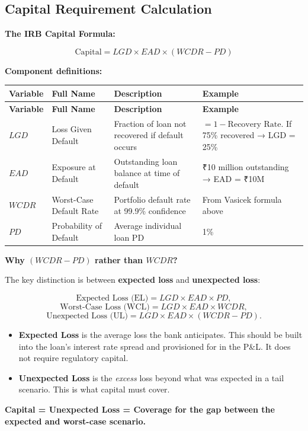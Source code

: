 \documentclass[12pt,openany]{book}
\theoremstyle{definition}
\theoremstyle{remark}
\begin{document}
\medskip
\subsection{Capital Requirement Calculation}
\textbf{The IRB Capital Formula:}

\[
\boxed{\text{Capital} = LGD \times EAD \times (WCDR - PD)}
\]

\textbf{Component definitions:}

\begingroup
\footnotesize
\begin{longtable}{@{}L{0.15\textwidth}L{0.25\textwidth}L{0.25\textwidth}L{0.25\textwidth}@{}}
\toprule
\textbf{Variable} & \textbf{Full Name} & \textbf{Description} & \textbf{Example} \\
\midrule
\endfirsthead
\toprule
\textbf{Variable} & \textbf{Full Name} & \textbf{Description} & \textbf{Example} \\
\midrule
\endhead
$LGD$ & Loss Given Default & Fraction of loan not recovered if default occurs & $= 1 - \text{Recovery Rate}$. If 75\% recovered → LGD = 25\% \\
$EAD$ & Exposure at Default & Outstanding loan balance at time of default & ₹10 million outstanding → EAD = ₹10M \\
$WCDR$ & Worst-Case Default Rate & Portfolio default rate at 99.9\% confidence & From Vasicek formula above \\
$PD$ & Probability of Default & Average individual loan PD & 1\% \\
\bottomrule
\end{longtable}
\endgroup
\textbf{Why $(WCDR - PD)$ rather than $WCDR$?}

The key distinction is between \textbf{expected loss} and \textbf{unexpected loss}:

\[
\text{Expected Loss (EL)}=LGD\times EAD\times PD,
\]
\[
\text{Worst-Case Loss (WCL)}=LGD\times EAD\times WCDR,
\]
\[
\text{Unexpected Loss (UL)}=LGD\times EAD\times(WCDR-PD).
\]

\begin{itemize}
\item \textbf{Expected Loss} is the average loss the bank anticipates. This should be built into the loan's interest rate spread and provisioned for in the P\&L. It does not require regulatory capital.


\item \textbf{Unexpected Loss} is the \emph{excess} loss beyond what was expected in a tail scenario. This is what capital must cover.


\end{itemize}
\textbf{Capital = Unexpected Loss = Coverage for the gap between the expected and worst-case scenario.}
\end{document}
